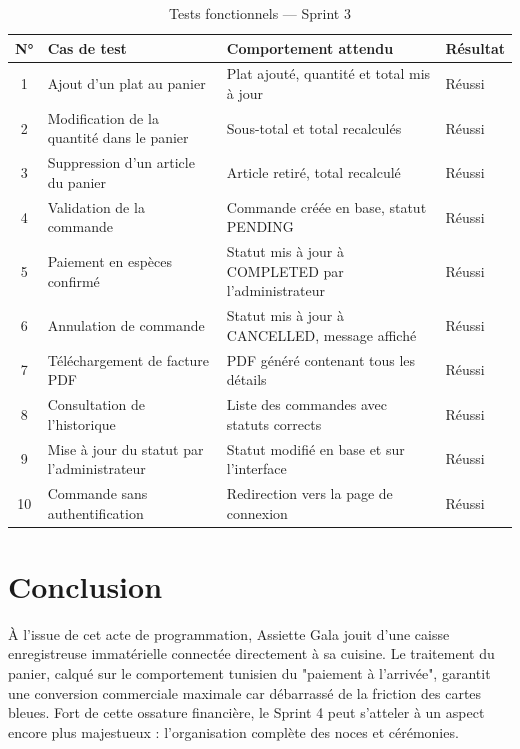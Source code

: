 \begin{table}[H]
    \centering
    \caption{Tests fonctionnels --- Sprint 3}
    \label{tab:tests_sprint3}
    \renewcommand{\arraystretch}{1.3}
    \begin{tabular}{|c|p{3cm}|p{3.5cm}|p{2.5cm}|}
        \hline
        \textbf{N°} & \textbf{Cas de test} & \textbf{Comportement attendu} & \textbf{Résultat} \\
        \hline
        1 & Ajout d'un plat au panier & Plat ajouté, quantité et total mis à jour & Réussi \\
        \hline
        2 & Modification de la quantité dans le panier & Sous-total et total recalculés & Réussi \\
        \hline
        3 & Suppression d'un article du panier & Article retiré, total recalculé & Réussi \\
        \hline
        4 & Validation de la commande & Commande créée en base, statut PENDING & Réussi \\
        \hline
        5 & Paiement en espèces confirmé & Statut mis à jour à COMPLETED par l'administrateur & Réussi \\
        \hline
        6 & Annulation de commande & Statut mis à jour à CANCELLED, message affiché & Réussi \\
        \hline
        7 & Téléchargement de facture PDF & PDF généré contenant tous les détails & Réussi \\
        \hline
        8 & Consultation de l'historique & Liste des commandes avec statuts corrects & Réussi \\
        \hline
        9 & Mise à jour du statut par l'administrateur & Statut modifié en base et sur l'interface & Réussi \\
        \hline
        10 & Commande sans authentification & Redirection vers la page de connexion & Réussi \\
        \hline
    \end{tabular}
\end{table}

\section{Conclusion}

À l'issue de cet acte de programmation, Assiette Gala jouit d'une caisse enregistreuse immatérielle connectée directement à sa cuisine. Le traitement du panier, calqué sur le comportement tunisien du "paiement à l'arrivée", garantit une conversion commerciale maximale car débarrassé de la friction des cartes bleues. Fort de cette ossature financière, le Sprint 4 peut s'atteler à un aspect encore plus majestueux : l'organisation complète des noces et cérémonies.
